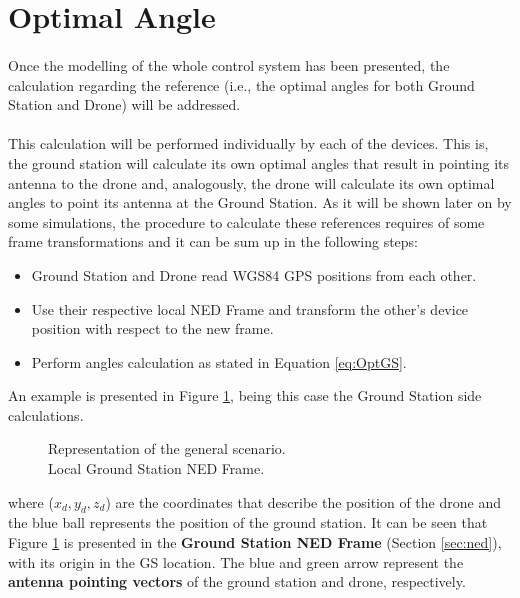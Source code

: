 \section{Optimal Angle}\label{sec:opt_angle}
\paragraph{} Once the modelling of the whole control system has been presented, the calculation regarding the reference (i.e., the optimal angles for both Ground Station and Drone) will be addressed.

\paragraph{} This calculation will be performed individually by each of the devices. This is, the ground station will calculate its own optimal angles that result in pointing its antenna to the drone and, analogously, the drone will calculate its own optimal angles to point its antenna at the Ground Station.
As it will be shown later on by some simulations, the procedure to calculate these references requires of some frame transformations and it can be sum up in the following steps:
\begin{itemize}
\item{Ground Station and Drone read WGS84 GPS positions from each other.}
\item{Use their respective local NED Frame and transform the other's device position with respect to the new frame.}
\item{Perform angles calculation as stated in Equation \ref{eq:OptGS}.}
\end{itemize}

An example is presented in Figure \ref{fig:Scenario1}, being this case the Ground Station side calculations.
\begin{figure}[H]
   \centering
     
    \caption{Representation of the general scenario. \\Local Ground Station NED Frame.}
    \label{fig:Scenario1}
\end{figure}
where ($x_d,y_d,z_d$) are the coordinates that describe the position of the drone and the blue ball represents the position of the ground station. It can be seen that Figure \ref{fig:Scenario1} is presented in the \textbf{Ground Station NED Frame} (Section \ref{sec:ned}), with its origin in the GS location.
The blue and green arrow represent the \textbf{antenna pointing vectors} of the ground station and drone, respectively.

